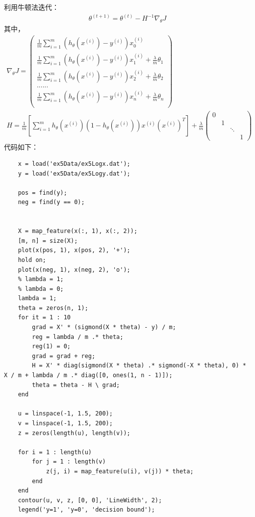 \documentclass{article}
\begin{document}
利用牛顿法迭代：
\begin{equation}
    \begin{split}
        \theta^{(t+1)}=\theta^{(t)}-H^{-1}\nabla_\theta J
    \end{split}
\end{equation}
其中，
\begin{equation}
    \begin{split}
        \nabla_\theta J=\begin{pmatrix}
            \frac{1}{m}\sum_{i=1}^m(h_\theta(x^{(i)})-y^{(i)})x_0^{(i)} \\
            \frac{1}{m}\sum_{i=1}^m(h_\theta(x^{(i)})-y^{(i)})x_1^{(i)} +\frac{\lambda}{m}\theta_1\\
            \frac{1}{m}\sum_{i=1}^m(h_\theta(x^{(i)})-y^{(i)})x_2^{(i)} +\frac{\lambda}{m}\theta_2\\
            ......\\
            \frac{1}{m}\sum_{i=1}^m(h_\theta(x^{(i)})-y^{(i)})x_n^{(i)} +\frac{\lambda}{m}\theta_n\\
        \end{pmatrix}\\
        H=\frac{1}{m}[\sum_{i=1}^mh_\theta(x^{(i)})(1-h_\theta(x^{(i)}))x^{(i)}(x^{(i)})^T]+\frac{\lambda}{m}\begin{pmatrix}
            0& & & \\ & 1 & & \\ & & \ddots & \\ & & & 1 
        \end{pmatrix}
    \end{split}
\end{equation}
代码如下：



\begin{lstlisting}
    x = load('ex5Data/ex5Logx.dat');
    y = load('ex5Data/ex5Logy.dat');

    pos = find(y); 
    neg = find(y == 0);


    X = map_feature(x(:, 1), x(:, 2));
    [m, n] = size(X);
    plot(x(pos, 1), x(pos, 2), '+');
    hold on;
    plot(x(neg, 1), x(neg, 2), 'o');
    % lambda = 1;
    % lambda = 0;
    lambda = 1;
    theta = zeros(n, 1);
    for it = 1 : 10
        grad = X' * (sigmond(X * theta) - y) / m;
        reg = lambda / m .* theta;
        reg(1) = 0;
        grad = grad + reg;
        H = X' * diag(sigmond(X * theta) .* sigmond(-X * theta), 0) * X / m + lambda / m .* diag([0, ones(1, n - 1)]);
        theta = theta - H \ grad;
    end

    u = linspace(-1, 1.5, 200);
    v = linspace(-1, 1.5, 200);
    z = zeros(length(u), length(v));

    for i = 1 : length(u)
        for j = 1 : length(v)
            z(j, i) = map_feature(u(i), v(j)) * theta;
        end
    end
    contour(u, v, z, [0, 0], 'LineWidth', 2);
    legend('y=1', 'y=0', 'decision bound');
\end{lstlisting}
\end{document}
